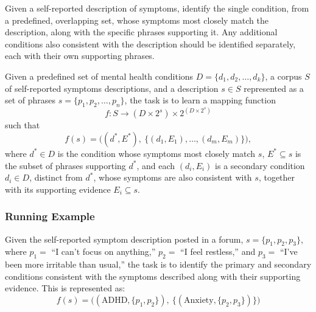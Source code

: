 \documentclass[sigconf]{acmart}
\begin{document}
Given a self-reported description of symptoms, identify the single
condition, from a predefined, overlapping set, whose symptoms most
closely match the description, along with the specific phrases
supporting it. Any additional conditions also consistent with the
description should be identified separately, each with their own
supporting phrases.

Given a predefined set of mental health conditions
$D = \{d_1, \allowbreak d_2, \allowbreak \ldots, \allowbreak d_k\}$, a corpus $S$ of self-reported symptoms
descriptions, and a description $s \in S$ represented as a set of
phrases $s = \{p_1, \allowbreak p_2, \allowbreak \ldots, \allowbreak p_n\}$, the task is to learn a mapping
function
\[f : S \rightarrow (D \times 2^{s}) \times 2^{(D \times 2^{s})}\]
such that
\[f(s) = \big( (d^{*}, E^{*}),\ \{(d_1, E_1), \ldots, (d_m, E_m)\} \big),\]
where $d^{*} \in D$ is the condition whose symptoms most closely match
$s$, $E^{*} \subseteq s$ is the subset of phrases supporting $d^{*}$,
and each $(d_i, E_i)$ is a secondary condition $d_i \in D$, distinct
from $d^{*}$, whose symptoms are also consistent with $s$, together
with its supporting evidence $E_i \subseteq s$.

\subsubsection{Running Example}

Given the self-reported symptom description posted in a forum,
$s = \{p_1, p_2, p_3\}$, where $p_1 =$ ``I can't focus on
anything,'' $p_2 =$ ``I feel restless,'' and $p_3 =$ ``I've been
more irritable than usual,'' the task is to identify the primary and
secondary conditions consistent with the symptoms described along
with their supporting evidence. This is represented as:
\[
f(s) = \big( (\text{ADHD}, \{p_1, p_2\}),\ \{(\text{Anxiety}, \{p_2, p_3\})\} \big)
\]




\begingroup
\small
\setlength{\bibsep}{0pt}


\endgroup
\end{document}
